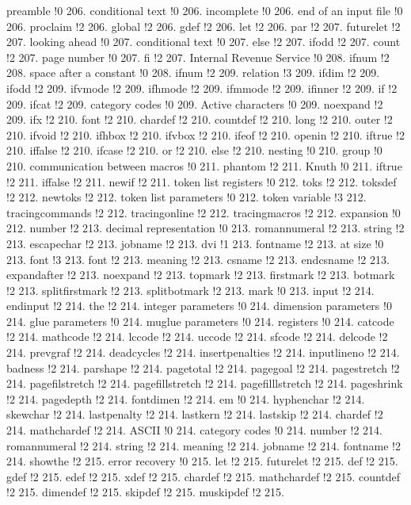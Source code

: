 preamble !0 206.
conditional text !0 206.
incomplete !0 206.
end of an input file !0 206.
proclaim !2 206.
global !2 206.
gdef !2 206.
let !2 206.
par !2 207.
futurelet !2 207.
looking ahead !0 207.
conditional text !0 207.
else !2 207.
ifodd !2 207.
count !2 207.
page number !0 207.
fi !2 207.
Internal Revenue Service !0 208.
ifnum !2 208.
space after a constant !0 208.
ifnum !2 209.
relation !3 209.
ifdim !2 209.
ifodd !2 209.
ifvmode !2 209.
ifhmode !2 209.
ifmmode !2 209.
ifinner !2 209.
if !2 209.
ifcat !2 209.
category codes !0 209.
Active characters !0 209.
noexpand !2 209.
ifx !2 210.
font !2 210.
chardef !2 210.
countdef !2 210.
long !2 210.
outer !2 210.
ifvoid !2 210.
ifhbox !2 210.
ifvbox !2 210.
ifeof !2 210.
openin !2 210.
iftrue !2 210.
iffalse !2 210.
ifcase !2 210.
or !2 210.
else !2 210.
nesting !0 210.
group !0 210.
communication between macros !0 211.
phantom !2 211.
Knuth !0 211.
iftrue !2 211.
iffalse !2 211.
newif !2 211.
token list registers !0 212.
toks !2 212.
toksdef !2 212.
newtoks !2 212.
token list parameters !0 212.
token variable !3 212.
tracingcommands !2 212.
tracingonline !2 212.
tracingmacros !2 212.
expansion !0 212.
number !2 213.
decimal representation !0 213.
romannumeral !2 213.
string !2 213.
escapechar !2 213.
jobname !2 213.
dvi !1 213.
fontname !2 213.
at size !0 213.
font !3 213.
font !2 213.
meaning !2 213.
csname !2 213.
endcsname !2 213.
expandafter !2 213.
noexpand !2 213.
topmark !2 213.
firstmark !2 213.
botmark !2 213.
splitfirstmark !2 213.
splitbotmark !2 213.
mark !0 213.
input !2 214.
endinput !2 214.
the !2 214.
integer parameters !0 214.
dimension parameters !0 214.
glue parameters !0 214.
muglue parameters !0 214.
registers !0 214.
catcode !2 214.
mathcode !2 214.
lccode !2 214.
uccode !2 214.
sfcode !2 214.
delcode !2 214.
prevgraf !2 214.
deadcycles !2 214.
insertpenalties !2 214.
inputlineno !2 214.
badness !2 214.
parshape !2 214.
pagetotal !2 214.
pagegoal !2 214.
pagestretch !2 214.
pagefilstretch !2 214.
pagefillstretch !2 214.
pagefilllstretch !2 214.
pageshrink !2 214.
pagedepth !2 214.
fontdimen !2 214.
em !0 214.
hyphenchar !2 214.
skewchar !2 214.
lastpenalty !2 214.
lastkern !2 214.
lastskip !2 214.
chardef !2 214.
mathchardef !2 214.
ASCII !0 214.
category codes !0 214.
number !2 214.
romannumeral !2 214.
string !2 214.
meaning !2 214.
jobname !2 214.
fontname !2 214.
showthe !2 215.
error recovery !0 215.
let !2 215.
futurelet !2 215.
def !2 215.
gdef !2 215.
edef !2 215.
xdef !2 215.
chardef !2 215.
mathchardef !2 215.
countdef !2 215.
dimendef !2 215.
skipdef !2 215.
muskipdef !2 215.
